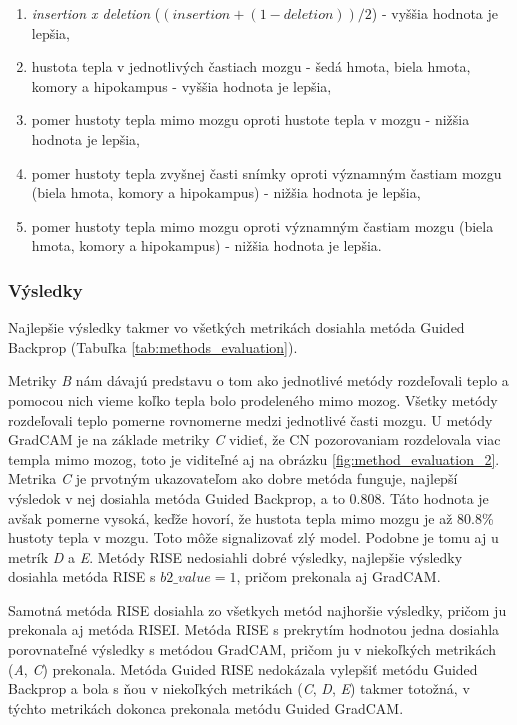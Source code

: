 \begin{enumerate}[label=\Alph*]
    \item \textit{insertion x deletion} ($(insertion + (1 - deletion)) / 2$) - vyššia hodnota je lepšia,
    \item hustota tepla v jednotlivých častiach mozgu - šedá hmota, biela hmota, komory a hipokampus - vyššia hodnota je lepšia,
    \item pomer hustoty tepla mimo mozgu oproti hustote tepla v mozgu - nižšia hodnota je lepšia,
    \item pomer hustoty tepla zvyšnej časti snímky oproti významným častiam mozgu (biela hmota, komory a hipokampus) - nižšia hodnota je lepšia,
    \item pomer hustoty tepla mimo mozgu oproti významným častiam mozgu (biela hmota, komory a hipokampus) - nižšia hodnota je lepšia.
\end{enumerate}

\subsubsection{Výsledky \label{sec:verification_experiments_results}}

Najlepšie výsledky takmer vo všetkých metrikách dosiahla metóda Guided Backprop (Tabuľka \ref{tab:methods_evaluation}). 

Metriky \textit{B} nám dávajú predstavu o tom ako jednotlivé metódy rozdeľovali teplo a pomocou nich vieme koľko tepla bolo prodeleného mimo mozog. Všetky metódy rozdeľovali teplo pomerne rovnomerne medzi jednotlivé časti mozgu. U metódy GradCAM je na základe metriky \textit{C} vidieť, že CN pozorovaniam rozdelovala viac templa mimo mozog, toto je viditeľné aj na obrázku \ref{fig:method_evaluation_2}. Metrika \textit{C} je prvotným ukazovateľom ako dobre metóda funguje, najlepší výsledok v nej dosiahla metóda Guided Backprop, a to $0.808$. Táto hodnota je avšak pomerne vysoká, keďže hovorí, že hustota tepla mimo mozgu je až 80.8\% hustoty tepla v mozgu. Toto môže signalizovať zlý model. Podobne je tomu aj u metrík \textit{D} a \textit{E}. Metódy RISE nedosiahli dobré výsledky, najlepšie výsledky dosiahla metóda RISE s $b2\_value = 1$, pričom prekonala aj GradCAM.

Samotná metóda RISE dosiahla zo všetkych metód najhoršie výsledky, pričom ju prekonala aj metóda RISEI. Metóda RISE s prekrytím hodnotou jedna dosiahla porovnateľné výsledky s metódou GradCAM, pričom ju v niekoľkých metrikách (\textit{A}, \textit{C}) prekonala. Metóda Guided RISE nedokázala vylepšiť metódu Guided Backprop a bola s ňou v niekoľkých metrikách (\textit{C}, \textit{D}, \textit{E}) takmer totožná, v týchto metrikách dokonca prekonala metódu Guided GradCAM.

